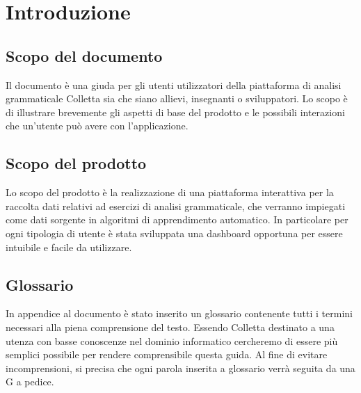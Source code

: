 \section{Introduzione}
\subsection{Scopo del documento}
Il documento \`e una giuda per gli utenti utilizzatori della piattaforma di analisi grammaticale Colletta sia che siano allievi, insegnanti o sviluppatori. Lo scopo è di illustrare brevemente gli aspetti di base del prodotto e le possibili interazioni che un'utente può avere con l'applicazione.
\subsection{Scopo del prodotto}
Lo scopo del prodotto è la realizzazione di una piattaforma interattiva per la raccolta dati relativi ad esercizi di analisi grammaticale, che verranno impiegati come dati sorgente in algoritmi di apprendimento automatico.
 In particolare per ogni tipologia di utente è stata sviluppata una {dashboard} opportuna per essere intuibile e facile da utilizzare.
\subsection{Glossario}
In appendice al documento \`e stato inserito un glossario contenente tutti i termini necessari alla piena comprensione del testo. Essendo Colletta destinato a una utenza con basse conoscenze nel dominio informatico cercheremo di essere più semplici possibile per rendere comprensibile questa guida. Al fine di evitare incomprensioni, si precisa che ogni parola inserita a glossario verrà seguita da una G a pedice.

